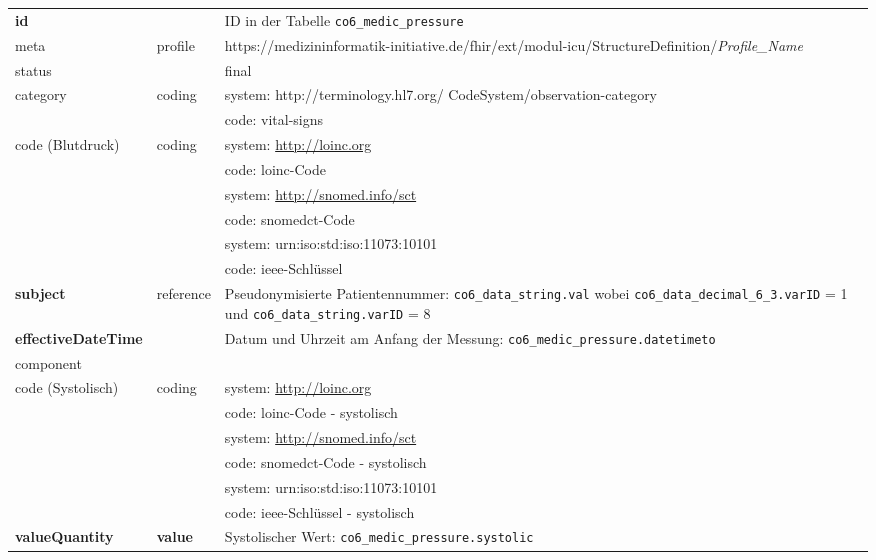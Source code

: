\begin{longtable}{|l|l|p{7cm}|} 
	\hline
	\rowcolor{lightgray} \multicolumn{3}{|l|}{Data Mapping (inhaltlich) - Blutdruckmessungen} \\ \hline
	\textbf{id} &  & ID in der Tabelle \texttt{co6\_medic\_pressure}  \\ \hline
	meta & profile & https://medizininformatik-initiative.de/fhir/ext/modul-icu/StructureDefinition/\textsl{Profile\_Name} \\ \hline 
	status &  & final  \\ \hline 
	category & coding & system: http://terminology.hl7.org/ CodeSystem/observation-category \\ 
	\cline{3-3}
	& & code: vital-signs \\ \hline
	code (Blutdruck) & coding & system: \url{http://loinc.org} \\ 
	\cline{3-3} 
	&  & code: \ac{loinc}-Code \\ 
	\cline{3-3} 
	&  & system: \url{http://snomed.info/sct} \\ 
	\cline{3-3}
	&  & code: \ac{snomedct}-Code \\ 
	\cline{3-3} 
	&  & system: urn:iso:std:iso:11073:10101 \\ 
	\cline{3-3}
	&  & code: \ac{ieee}-Schlüssel \\ \hline
	\textbf{subject} & reference & Pseudonymisierte Patientennummer: \texttt{co6\_data\_string.val} wobei \texttt{co6\_data\_decimal\_6\_3.varID} = 1 und \texttt{co6\_data\_string.varID} = 8 \\ \hline
	\textbf{effectiveDateTime} & & Datum und Uhrzeit am Anfang der Messung:  \texttt{co6\_medic\_pressure.datetimeto} \\ \hline
	\multicolumn{3}{|l|}{component} \\ \hline
	code (Systolisch) & coding & system: \url{http://loinc.org} \\ 
	\cline{3-3} 
	&  & code: \ac{loinc}-Code - systolisch \\ 
	\cline{3-3} 
	&  & system: \url{http://snomed.info/sct} \\ 
	\cline{3-3}
	&  & code: \ac{snomedct}-Code - systolisch \\ 
	\cline{3-3} 
	&  & system: urn:iso:std:iso:11073:10101 \\ 
	\cline{3-3}
	&  & code: \ac{ieee}-Schlüssel - systolisch \\ \hline	
	\textbf{valueQuantity} & \textbf{value} & Systolischer Wert: \texttt{co6\_medic\_pressure.systolic} \\

\end{longtable}
